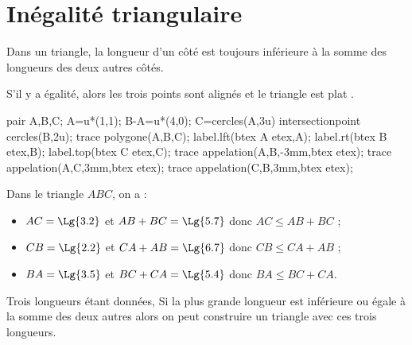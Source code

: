 \section{Inégalité triangulaire}
\begin{propriete}[\admise]
   Dans un triangle, la longueur d'un côté est toujours inférieure à la somme des longueurs des deux autres côtés.
\end{propriete}

\begin{remarque}
     S'il y a égalité, alors les trois points sont alignés et le triangle est \og plat \fg.
\end{remarque}

\begin{exemple}
   \begin{center}
        \begin{Geometrie}
            pair A,B,C;
            A=u*(1,1);
            B-A=u*(4,0);
            C=cercles(A,3u) intersectionpoint cercles(B,2u);
            trace polygone(A,B,C);
            label.lft(btex A etex,A);
            label.rt(btex B etex,B);
            label.top(btex C etex,C);
            trace appelation(A,B,-3mm,btex  etex);
            trace appelation(A,C,3mm,btex   etex);
            trace appelation(C,B,3mm,btex   etex);
        \end{Geometrie}
    \end{center}
   \correction
   Dans le triangle $ABC$, on a :
   \begin{itemize}
      \item $AC =\Lg{3.2}$ et $AB+BC =\Lg{5.7}$ donc $AC\leq AB+BC$ ;
      \item $CB =\Lg{2.2}$ et $CA+AB =\Lg{6.7}$ donc $CB\leq CA+AB$ ;
      \item $BA =\Lg{3.5}$ et $BC+CA =\Lg{5.4}$ donc $BA\leq BC+CA$.
   \end{itemize}
\end{exemple}

\begin{propriete}
    Trois longueurs étant données, Si la plus grande longueur est inférieure ou égale à la somme des deux autres alors on peut construire un triangle avec ces trois longueurs.
 \end{propriete}